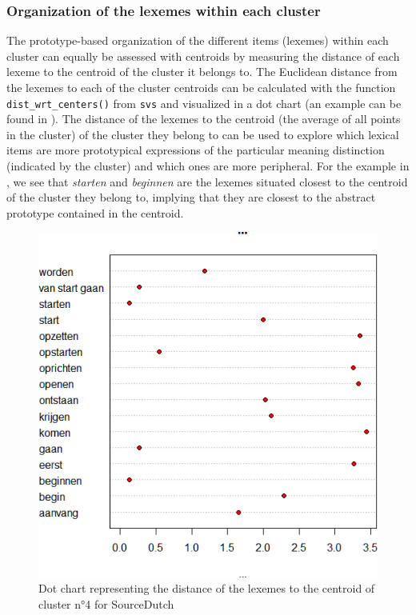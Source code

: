 \subsubsection{Organization of the lexemes within each cluster}
\label{sec:3.8.1.2}
The prototype-based organization of the different items (lexemes) within each cluster can equally be assessed with centroids by measuring the distance of each lexeme to the centroid of the cluster it belongs to. The Euclidean distance from the lexemes to each of the cluster centroids can be calculated with the function \texttt{dist\_wrt\_centers()} from \texttt{svs} and visualized in a dot chart (an example can be found in ). The distance of the lexemes to the centroid (the average of all points in the cluster) of the cluster they belong to can be used to explore which lexical items are more prototypical expressions of the particular meaning distinction (indicated by the cluster) and which ones are more peripheral. For the example in , we see that \textit{starten} and \textit{beginnen} are the lexemes situated closest to the centroid of the cluster they belong to, implying that they are closest to the abstract prototype contained in the centroid.

\begin{figure}
\includegraphics[height=.4\textheight]{figures/Vandevoorde2-img49.png}
\caption{\label{fig:3:49}Dot chart representing the distance of the lexemes to the centroid of cluster n°4 for SourceDutch}
\end{figure}\largerpage

